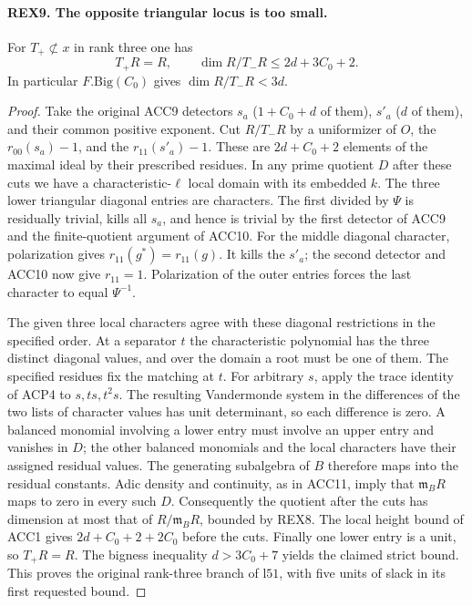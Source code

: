 \paragraph{REX9. The opposite triangular locus is too small.}
\label{claim:REX9}
For \(T_+\not\subset x\) in rank three one has
\[
 T_+R=R,\qquad \dim R/T_-R\le2d+3C_0+2 .
\]
In particular \(F.\mathrm{Big}(C_0)\) gives \(\dim R/T_-R<3d\).
\begin{proof}
Take the original ACC9 detectors \(s_a\) (\(1+C_0+d\) of them),
\(s'_a\) (\(d\) of them), and their common positive exponent.
Cut \(R/T_-R\) by a uniformizer of \(O\), the \(r_{00}(s_a)-1\),
and the \(r_{11}(s'_a)-1\). These are \(2d+C_0+2\) elements of
the maximal ideal by their prescribed residues. In any prime
quotient \(D\) after these cuts we have a characteristic-\(\ell\)
local domain with its embedded \(k\). The three lower triangular
diagonal entries are characters. The first divided by \(\Psi\) is
residually trivial, kills all \(s_a\), and hence is trivial by the
first detector of ACC9 and the finite-quotient argument of ACC10.
For the middle diagonal character, polarization gives
\(r_{11}(g^*)=r_{11}(g)\). It kills the \(s'_a\); the second detector
and ACC10 now give \(r_{11}=1\). Polarization of the outer entries
forces the last character to equal \(\Psi^{-1}\).

The given three local characters agree with these diagonal restrictions
in the specified order. At a separator \(t\) the characteristic polynomial
has the three distinct diagonal values, and over the domain a root must
be one of them. The specified residues fix the matching at \(t\).
For arbitrary \(s\), apply the trace identity of ACP4 to
\(s,ts,t^2s\). The resulting Vandermonde system in the differences
of the two lists of character values has unit determinant, so each
difference is zero. A balanced monomial involving a lower entry
must involve an upper entry and vanishes in \(D\); the other balanced
monomials and the local characters have their assigned residual values.
The generating subalgebra of \(B\) therefore maps into the residual
constants. Adic density and continuity, as in ACC11, imply that
\(\mathfrak m_B R\) maps to zero in every such \(D\). Consequently
the quotient after the cuts has dimension at most that of
\(R/\mathfrak m_B R\), bounded by REX8. The local height bound of
ACC1 gives \(2d+C_0+2+2C_0\) before the cuts. Finally one lower
entry is a unit, so \(T_+R=R\). The bigness inequality
\(d>3C_0+7\) yields the claimed strict bound. This proves the
original rank-three branch of \(\mathrm{l51}\), with five units
of slack in its first requested bound.
\end{proof}

